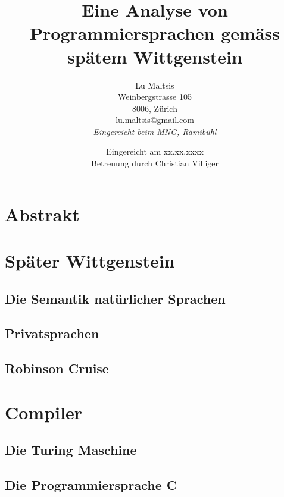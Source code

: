 \documentclass[a4paper,12pt]{article}
\begin{document}
\title{\Large{\textbf{Eine Analyse von Programmiersprachen gemäss spätem Wittgenstein}}}
\author{Lu Maltsis \\
Weinbergstrasse 105 \\
8006, Zürich \\
lu.maltsis@gmail.com \\
\textit{Eingereicht beim MNG, Rämibühl}
}
\date{Eingereicht am xx.xx.xxxx \\
\vspace{10mm}
Betreuung durch Christian Villiger}
\maketitle
\newpage


\section{Abstrakt}
\blindtext[1]


\tableofcontents{}


\section{Später Wittgenstein}
\blindtext[1]

\subsection{Die Semantik natürlicher Sprachen}
\blindtext[1]

\subsection{Privatsprachen}
\blindtext[1]

\subsection{Robinson Cruise}
\blindtext[1]


\section{Compiler}
\blindtext[1]

\subsection{Die Turing Maschine}
\blindtext[1]

\subsection{Die Programmiersprache C}
\blindtext[1]
\end{document}
